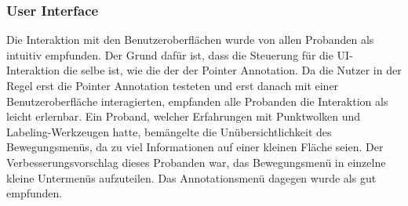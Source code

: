 \subsubsection{User Interface}
Die Interaktion mit den Benutzeroberflächen wurde von allen Probanden als intuitiv empfunden. Der Grund dafür ist, dass die Steuerung für die UI-Interaktion die selbe ist, wie die der der Pointer Annotation. Da die Nutzer in der Regel erst die Pointer Annotation testeten und erst danach mit einer Benutzeroberfläche interagierten, empfanden alle Probanden die Interaktion als leicht erlernbar. Ein Proband, welcher Erfahrungen mit Punktwolken und Labeling-Werkzeugen hatte, bemängelte die Unübersichtlichkeit des Bewegungsmenüs, da zu viel Informationen auf einer kleinen Fläche seien. Der Verbesserungsvorschlag dieses Probanden war, das Bewegungsmenü in einzelne kleine Untermenüs aufzuteilen. Das Annotationsmenü dagegen wurde als gut empfunden.







